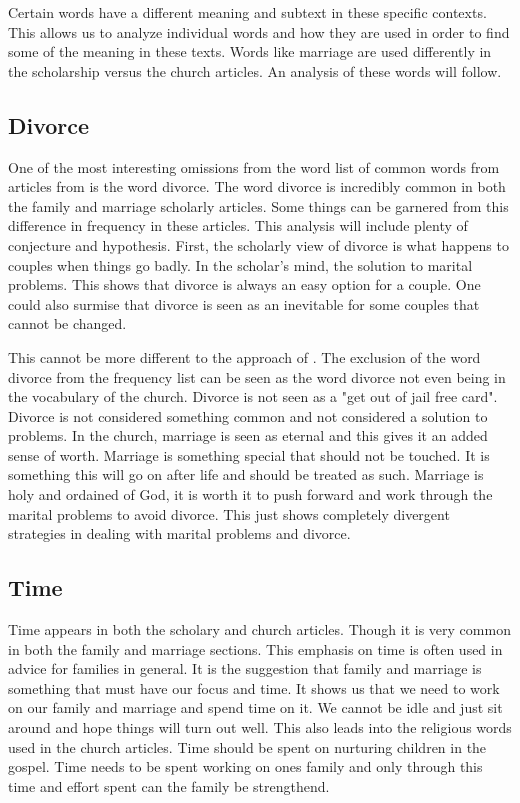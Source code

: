 \documentclass[twocolumn]{article}
\begin{document}
Certain words have a different meaning and subtext in these specific contexts. This allows us to analyze individual words and how they are used in order to find some of the meaning in these texts. Words like marriage are used differently in the scholarship versus the church articles. An analysis of these words will follow.
\subsection{Divorce}

One of the most interesting omissions from the word list of common words from articles from \church is the word divorce. The word divorce is incredibly common in both the family and marriage scholarly articles. Some things can be garnered from this difference in frequency in these articles. This analysis will include plenty of conjecture and hypothesis. First, the scholarly view of divorce is what happens to couples when things go badly. In the scholar's mind, the solution to marital problems. This shows that divorce is always an easy option for a couple. One could also surmise that divorce is seen as an inevitable for some couples that cannot be changed.

This cannot be more different to the approach of \church. The exclusion of the word divorce from the frequency list can be seen as the word divorce not even being in the vocabulary of the church. Divorce is not seen as a "get out of jail free card". Divorce is not considered something common and not considered a solution to problems. In the church, marriage is seen as eternal and this gives it an added sense of worth. Marriage is something special that should not be touched. It is something this will go on after life and should be treated as such. Marriage is holy and ordained of God, it is worth it to push forward and work through the marital problems to avoid divorce. This just shows completely divergent strategies in dealing with marital problems and divorce.

\subsection{Time}

Time appears in both the scholary and church articles. Though it is very common in both the family and marriage sections. This emphasis on time is often used in advice for families in general. It is the suggestion that family and marriage is something that must have our focus and time. It shows us that we need to work on our family and marriage and spend time on it. We cannot be idle and just sit around and hope things will turn out well. This also leads into the religious words used in the church articles. Time should be spent on nurturing children in the gospel. Time needs to be spent working on ones family and only through this time and effort spent can the family be strengthend.
\end{document}
